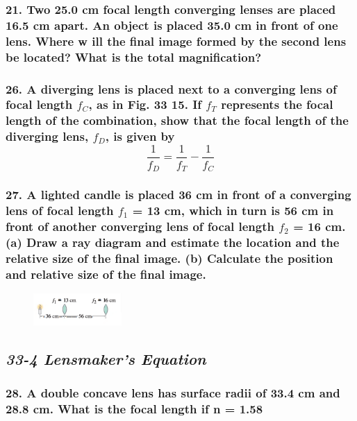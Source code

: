 \documentclass{article}
\begin{document}
\subsubsection*{
    21. Two 25.0 cm focal length converging lenses are placed 16.5 cm apart. An object is placed 35.0 cm
    in front of one lens. Where w ill the final image formed by the second lens be located? What is the
    total magnification?
}
\subsubsection*{
    26. A diverging lens is placed next to a converging lens of
focal length $f_C$, as in Fig. 33 15. If $f_T$ represents the focal
length of the combination, show that the focal length of the
diverging lens, $f_D$, is given by
\[
    \displaystyle\frac{1}{f_D} = \displaystyle\frac{1}{f_T} -
    \displaystyle\frac{1}{f_C}
\]
}

\subsubsection*{
    27. A lighted candle is placed 36 cm in front of a converging lens of focal length $f_1$ = 13 cm,
    which in turn is 56 cm in front of another converging lens of focal length $f_2$ = 16 cm. (a) Draw a 
    ray diagram and estimate the location and the relative size of the final image. (b) Calculate 
    the position and relative size of the final image.
}
\begin{figure}[h]
    \begin{center}
        \includegraphics[width=0.3\textwidth]{figures/p27.png}
    \end{center}
\end{figure}
\newpage
\begin{center}
    \subsection*{\textbf{\textit{33-4 Lensmaker's Equation}}}
\end{center}
\subsubsection*{
    28. A double concave lens has surface radii of 33.4 cm and 28.8 cm. What is the focal length if n = 1.58
}
\end{document}
